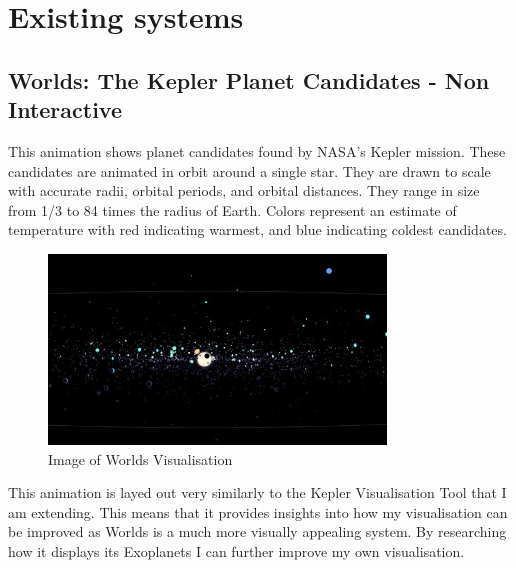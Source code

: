 \section{Existing systems}
\subsection{Worlds: The Kepler Planet Candidates - Non Interactive}
 This animation \cite{worlds} shows  planet candidates found by NASA's Kepler mission. These candidates are animated in orbit around a single star. They are drawn to scale with accurate radii, orbital periods, and orbital distances. They range in size from 1/3 to 84 times the radius of Earth. Colors represent an estimate of temperature with red indicating warmest, and blue indicating coldest candidates. 
\begin{figure}[h!]
  \centering
      \includegraphics[width=0.8\textwidth]{images/worlds.jpg}
  \caption{Image of Worlds Visualisation}
\end{figure}
This animation is layed out very similarly to the Kepler Visualisation Tool that I am extending. This means that it provides insights into how my visualisation can be improved as Worlds is a much more visually appealing system. By researching how it displays its Exoplanets I can further improve my own visualisation.

